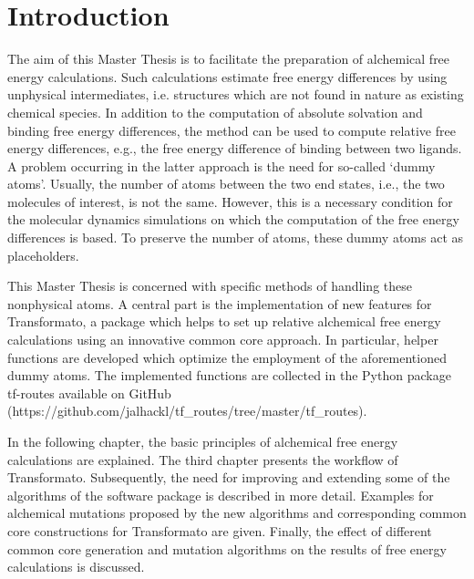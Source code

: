 \chapter{Introduction}

The aim of this Master Thesis is to facilitate the preparation of
alchemical free energy calculations. Such calculations
estimate free energy differences by using unphysical intermediates, i.e. structures
which are not found in nature as existing chemical species. In addition
to the computation of absolute solvation and binding free energy differences,
the method can be used to compute relative free energy differences, e.g.,
the free energy difference of binding between two ligands. A problem occurring
in the latter approach is the need for so-called \textquoteleft dummy
atoms\textquoteright . Usually, the number of atoms between the two
end states, i.e., the two molecules of interest, is not the same.
However, this is a necessary condition for the molecular dynamics
simulations on which the computation of the free energy differences
is based. To preserve the number of atoms, these dummy atoms act as
placeholders\cite{Fleck.2021, Karwounopoulos.2022}.

This Master Thesis is concerned with specific methods of handling these nonphysical
atoms. A central part is the implementation of new features
for Transformato, a package which helps to set up relative alchemical
free energy calculations using an innovative common core approach\cite{key-2, Wieder.2022}.
In particular, helper functions are developed which optimize the employment of
the aforementioned dummy atoms. 
The implemented functions are collected in the  Python package tf-routes available on GitHub (https://github.com/jalhackl/tf\_routes/tree/master/tf\_routes).

In the following chapter, the basic principles of alchemical free energy
calculations are explained. The third chapter presents the workflow
of Transformato. Subsequently, the need for improving and extending some of the algorithms of the software
package is described in more detail. Examples for alchemical mutations
proposed by the new algorithms and corresponding common core constructions
for Transformato are given. Finally, the effect of different common core generation and mutation
algorithms on the results of free energy calculations is discussed.